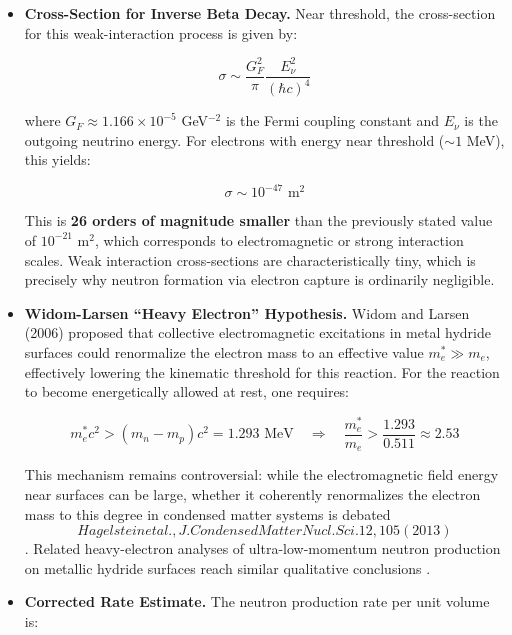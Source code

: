 \documentclass[11pt,a4paper]{article}
\begin{document}
\begin{itemize}
\item
  \textbf{Cross-Section for Inverse Beta Decay.} Near threshold, the cross-section for this weak-interaction process is given by:

  \begin{equation}
\sigma \sim \frac{G_F^2}{\pi} \frac{E_\nu^2}{(\hbar c)^4}
\end{equation}

  where $G_F \approx 1.166 \times 10^{-5}$ GeV$^{-2}$ is the Fermi coupling constant and $E_\nu$ is the outgoing neutrino energy. For electrons with energy near threshold ($\sim 1$ MeV), this yields:

  \begin{equation}
\sigma \sim 10^{-47} \text{ m}^2
\end{equation}

  This is \textbf{26 orders of magnitude smaller} than the previously stated value of $10^{-21}$ m$^2$, which corresponds to electromagnetic or strong interaction scales. Weak interaction cross-sections are characteristically tiny, which is precisely why neutron formation via electron capture is ordinarily negligible.
\item
  \textbf{Widom-Larsen ``Heavy Electron'' Hypothesis.} Widom and Larsen (2006) proposed that collective electromagnetic excitations in metal hydride surfaces could renormalize the electron mass to an effective value $m_e^* \gg m_e$, effectively lowering the kinematic threshold for this reaction. For the reaction to become energetically allowed at rest, one requires:

  \begin{equation}
m_e^* c^2 > (m_n - m_p)c^2 = 1.293 \text{ MeV} \quad \Rightarrow \quad \frac{m_e^*}{m_e} > \frac{1.293}{0.511} \approx 2.53
\end{equation}

  This mechanism remains controversial: while the electromagnetic field energy near surfaces can be large, whether it coherently renormalizes the electron mass to this degree in condensed matter systems is debated \begin{equation}
Hagelstein et al., J. Condensed Matter Nucl. Sci. 12, 105 (2013)
\end{equation}. Related heavy-electron analyses of ultra-low-momentum neutron production on metallic hydride surfaces reach similar qualitative conclusions \citep{safajuei2023}.
\item
  \textbf{Corrected Rate Estimate.} The neutron production rate per unit volume is:


\end{itemize}
\end{document}

